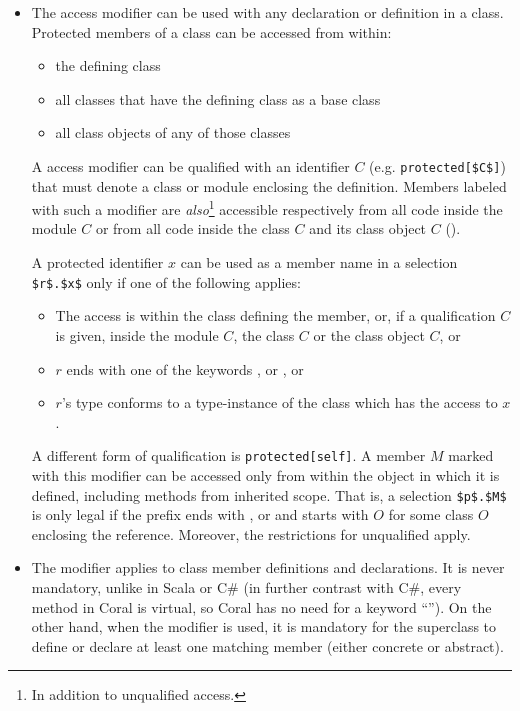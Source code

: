 \begin{itemize}
  \item The  access modifier can be used with any declaration or definition in a class. Protected members of a class can be accessed from within: 
  \begin{itemize}
    \item the defining class
    \item all classes that have the defining class as a base class
    \item all class objects of any of those classes
  \end{itemize}

  A  access modifier can be qualified with an identifier $C$ (e.g. \lstinline!protected[$C$]!) that must denote a class or module enclosing the definition. Members labeled with such a modifier are {\em also}\footnote{In addition to unqualified  access.} accessible respectively from all code inside the module $C$ or from all code inside the class $C$ and its class object $C$ (). 

  A protected identifier $x$ can be used as a member name in a selection \lstinline!$r$.$x$! only if one of the following applies: 
  \begin{itemize}
    \item The access is within the class defining the member, or, if a qualification $C$ is given, inside the module $C$, the class $C$ or the class object $C$, or
    \item $r$ ends with one of the keywords ,  or , or
    \item $r$'s type conforms to a type-instance of the class which has the access to $x$. 
  \end{itemize}

  A different form of qualification is \lstinline!protected[self]!. A member $M$ marked with this modifier can be accessed only from within the object in which it is defined, including methods from inherited scope. That is, a selection \lstinline!$p$.$M$! is only legal if the prefix ends with ,  or  and starts with $O$ for some class $O$ enclosing the reference. Moreover, the restrictions for unqualified  apply. 

  \item The  modifier applies to class member definitions and declarations. It is never mandatory, unlike in Scala or C\# (in further contrast with C\#, every method in Coral is virtual, so Coral has no need for a keyword ``''). On the other hand, when the modifier is used, it is mandatory for the superclass to define or declare at least one matching member (either concrete or abstract). 


\end{itemize}
